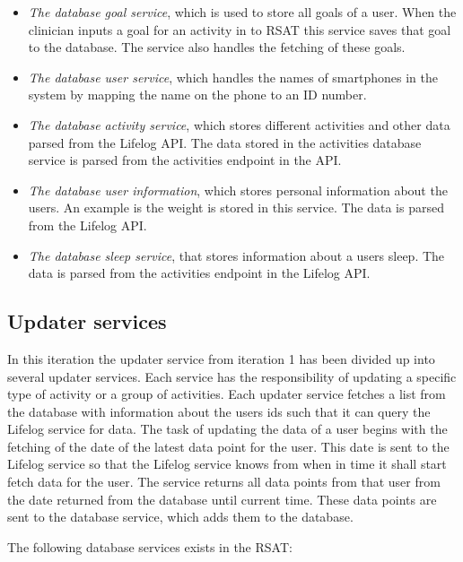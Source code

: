 \documentclass{cslthse-msc}
\begin{document}
\begin{itemize}
\item \emph{The database goal service}, which is used to store all goals of a user. When the clinician inputs a goal for an activity in to RSAT this service saves that goal to the database. The service also handles the fetching of these goals. 

\item \emph{The database user service}, which handles the names of smartphones in the system by mapping the name on the phone to an ID number. %

\item \emph{The database activity service}, which stores different activities and other data parsed from the Lifelog API. The data stored in the activities database service is parsed from the activities endpoint in the API. 

\item \emph{The database user information}, which stores personal information about the users. An example is the weight is stored in this service. The data is parsed from the Lifelog API.

\item \emph{The database sleep service}, that stores information about a users sleep. The data is parsed from the activities endpoint in the Lifelog API.
\end{itemize}

\subsection{Updater services}

In this iteration the updater service from iteration 1 has been divided up into several updater services. Each service has the responsibility of updating a specific type of activity or a group of activities. Each updater service fetches a list from the database with information about the users ids such that it can query the Lifelog service for data. The task of updating the data of a user begins with the fetching of the date of the latest data point for the user. This date is sent to the Lifelog service so that the Lifelog service knows from when in time it shall start fetch data for the user. The service returns all data points from that user from the date returned from the database until current time. These data points are sent to the database service, which adds them to the database. 

The following database services exists in the RSAT:
\end{document}
